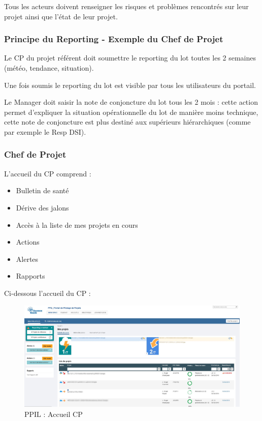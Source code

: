 \vspace{1\baselineskip}

Tous les acteurs doivent renseigner les risques et problèmes rencontrés sur leur projet ainsi que l'état de leur projet.

\subsubsection{Principe du Reporting - Exemple du Chef de Projet}
Le CP du projet référent doit soumettre le reporting du lot toutes les 2 semaines (météo, tendance, situation).

Une fois soumis le reporting du lot est visible par tous les utilisateurs du portail.

Le Manager doit saisir la note de conjoncture du lot tous les 2 mois : cette action permet d'expliquer la situation opérationnelle du lot de manière moins technique, cette note de conjoncture est plus destiné aux supérieurs hiérarchiques (comme par exemple le Resp DSI).

\subsubsection{Chef de Projet}

L'accueil du CP comprend :

\begin{itemize}
    \item Bulletin de santé
    \item Dérive des jalons
    \item Accès à la liste de mes projets en cours
    \item Actions
    \item Alertes
    \item Rapports
\end{itemize}

Ci-dessous l'accueil du CP :

\begin{figure}[!h]
\centering
\includegraphics[width=1\textwidth]{images/ppil-CP-censored.png}
\caption{PPIL : Accueil CP}
\end{figure}


